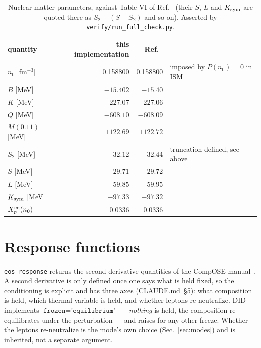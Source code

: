 \documentclass[aps,prc,onecolumn,superscriptaddress,nofootinbib,10pt]{revtex4-2}
\newcommand{\nzero}{n_0}
\begin{document}
\begin{table}[h]
\centering
\begin{tabular}{lrrl}
\toprule
quantity & this implementation & Ref.~\cite{Frohaug2025} & \\
\midrule
$\nzero$ [fm$^{-3}$] & 0.158800 & 0.158800 & imposed by $P(\nzero) = 0$ in ISM \\
$B$ [MeV]            & $-15.402$ & $-15.40$ & \\
$K$ [MeV]            & $227.07$ & $227.06$ & \\
$Q$ [MeV]            & $-608.10$ & $-608.09$ & \\
$M(0.11)$ [MeV]      & $1122.69$ & $1122.72$ & \\
$S_2$ [MeV]          & $32.12$ & $32.44$ & truncation-defined, see above \\
$S$ [MeV]            & $29.71$ & $29.72$ & \\
$L$ [MeV]            & $59.85$ & $59.95$ & \\
$K_{\rm sym}$ [MeV]  & $-97.33$ & $-97.32$ & \\
$X_p^{\rm eq}(\nzero)$ & $0.0336$ & $0.0336$ & \\
\bottomrule
\end{tabular}
\caption{Nuclear-matter parameters, against Table VI of
Ref.~\cite{Frohaug2025} (their $S$, $L$ and $K_{\rm sym}$ are quoted there as
$S_2 + (S - S_2)$ and so on). Asserted by
\texttt{verify/run\_full\_check.py}.}
\end{table}

\section{Response functions}
\label{sec:response}

\texttt{eos\_response} returns the second-derivative quantities of the CompOSE
manual~\cite{TypelCompOSE2015,Constantinou2025}. A second derivative is only
defined once one says what is held fixed, so the conditioning is explicit and
has three axes (CLAUDE.md~\S5): what composition is held, which thermal
variable is held, and whether leptons re-neutralize. DID implements
$\texttt{frozen} = \texttt{'equilibrium'}$ --- \emph{nothing} is held, the
composition re-equilibrates under the perturbation --- and raises for any other
freeze. Whether the leptons re-neutralize is the mode's own choice
(Sec.~\ref{sec:modes}) and is inherited, not a separate argument.
\end{document}
